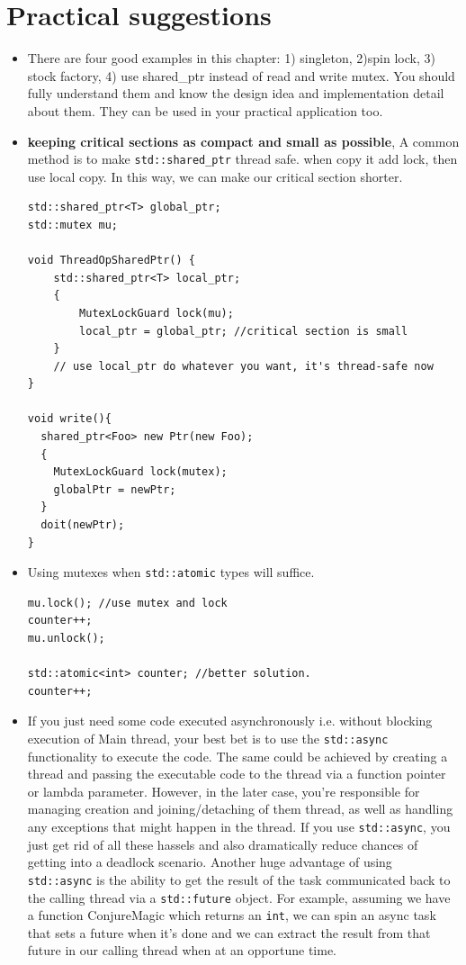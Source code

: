 \documentclass[a4paper,11pt,twoside]{book}
\begin{document}
\section{Practical suggestions}
\begin{itemize}
	\item There are four good examples in this chapter: 1) singleton, 2)spin lock, 3) stock factory, 4) use shared\_ptr instead of read and write mutex. You should fully understand them and know the design idea and implementation detail about them. They can be used in your practical application too.
	
    \item \textbf{keeping critical sections as compact and small as possible},  A common method is to make \texttt{std::shared\_ptr} thread safe. when copy it add lock, then use local copy. In this way, we can make our critical section shorter.
\begin{lstlisting}
std::shared_ptr<T> global_ptr;
std::mutex mu;

void ThreadOpSharedPtr() {
    std::shared_ptr<T> local_ptr;
    { 
        MutexLockGuard lock(mu);
        local_ptr = global_ptr; //critical section is small 
    }
    // use local_ptr do whatever you want, it's thread-safe now
}

void write(){
  shared_ptr<Foo> new Ptr(new Foo);
  {
	MutexLockGuard lock(mutex);
	globalPtr = newPtr;
  }
  doit(newPtr);
}
\end{lstlisting}
    
    \item Using mutexes when \texttt{std::atomic} types will suffice.
\begin{lstlisting}[]
mu.lock(); //use mutex and lock 
counter++;
mu.unlock();

std::atomic<int> counter; //better solution.
counter++;
\end{lstlisting}
    
    \item If you just need some code executed asynchronously i.e. without blocking execution of Main thread, your best bet is to use the \texttt{std::async} functionality to execute the code. The same could be achieved by creating a thread and passing the executable code to the thread via a function pointer or lambda parameter. However, in the later case, you're responsible for managing creation and joining/detaching of them thread, as well as handling any exceptions that might happen in the thread. If you use \texttt{std::async}, you just get rid of all these hassels and also dramatically reduce chances of getting into a deadlock scenario. Another huge advantage of using \texttt{std::async} is the ability to get the result of the task communicated back to the calling thread via a \texttt{std::future} object. For example, assuming we have a function ConjureMagic which returns an \texttt{int}, we can spin an async task that sets a future when it's done and we can extract the result from that future in our calling thread when at an opportune time.
    

\end{itemize}
\end{document}
